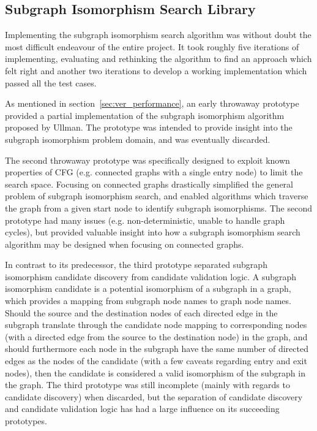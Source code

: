 
\subsection{Subgraph Isomorphism Search Library}
\label{sec:impl_subgraph_isomorphism_search_library}

Implementing the subgraph isomorphism search algorithm was without doubt the most difficult endeavour of the entire project. It took roughly five iterations of implementing, evaluating and rethinking the algorithm to find an approach which felt right and another two iterations to develop a working implementation which passed all the test cases.

As mentioned in section~\ref{sec:ver_performance}, an early throwaway prototype provided a partial implementation of the subgraph isomorphism algorithm proposed by Ullman. The prototype was intended to provide insight into the subgraph isomorphism problem domain, and was eventually discarded.

The second throwaway prototype was specifically designed to exploit known properties of CFG (e.g. connected graphs with a single entry node) to limit the search space. Focusing on connected graphs drastically simplified the general problem of subgraph isomorphism search, and enabled algorithms which traverse the graph from a given start node to identify subgraph isomorphisms. The second prototype had many issues (e.g. non-deterministic, unable to handle graph cycles), but provided valuable insight into how a subgraph isomorphism search algorithm may be designed when focusing on connected graphs.

In contrast to its predecessor, the third prototype separated subgraph isomorphism candidate discovery from candidate validation logic. A subgraph isomorphism candidate is a potential isomorphism of a subgraph in a graph, which provides a mapping from subgraph node names to graph node names. Should the source and the destination nodes of each directed edge in the subgraph translate through the candidate node mapping to corresponding nodes (with a directed edge from the source to the destination node) in the graph, and should furthermore each node in the subgraph have the same number of directed edges as the nodes of the candidate (with a few caveats regarding entry and exit nodes), then the candidate is considered a valid isomorphism of the subgraph in the graph. The third prototype was still incomplete (mainly with regards to candidate discovery) when discarded, but the separation of candidate discovery and candidate validation logic has had a large influence on its succeeding prototypes.

